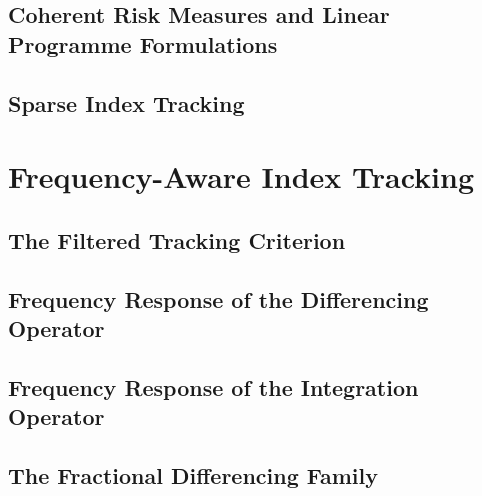 \documentclass[12pt,a4paper]{article}
\begin{document}

\subsection{Coherent Risk Measures and Linear Programme Formulations}
\label{sec:risk_measures}

\subsection{Sparse Index Tracking}
\label{sec:sparsity}

\section{Frequency-Aware Index Tracking}
\label{sec:freq_tracking}

\subsection{The Filtered Tracking Criterion}
\label{sec:general_freq}

\subsection{Frequency Response of the Differencing Operator}
\label{sec:corr_response}

\subsection{Frequency Response of the Integration Operator}
\label{sec:coint_response}

\subsection{The Fractional Differencing Family}
\label{sec:frac_response}
\end{document}
